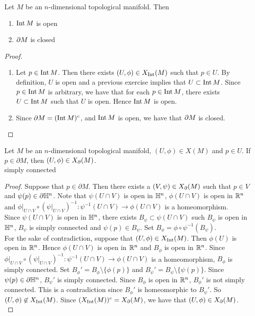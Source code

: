 \documentclass{book}
\begin{document}
	\begin{ex}
		Let $M$ be an $n$-dimensional topological manifold. Then 
		\begin{enumerate}
			\item $\operatorname{Int} M$ is open
			\item $\partial M$ is closed
		\end{enumerate}
	\end{ex}
	
	\begin{proof}\
		\begin{enumerate}
			\item Let $p \in \operatorname{Int} M$. Then there exists $(U, \phi) \in X_{\operatorname{Int}}(M)$ such that $p \in U$. By definition, $U$ is open and a previous exercise implies that $U \subset \operatorname{Int} M$. Since $p \in \operatorname{Int} M$ is arbitrary, we have that for each $p \in \operatorname{Int} M$, there exists $U \subset \operatorname{Int} M$ such that $U$ is open. Hence $\operatorname{Int} M$ is open. 
			\item Since $\partial M = (\operatorname{Int} M)^c$, and $\operatorname{Int} M$ is open, we have that $\partial M$ is closed.
		\end{enumerate}
	\end{proof}

	\begin{ex}
		Let $M$ be an $n$-dimensional topological manifold, $(U, \phi) \in X(M)$ and $p \in U$. If $p \in \partial M$, then $(U, \phi) \in X_{\partial}(M)$. \\
		\tbf{Hint:} simply connected
	\end{ex}

	\begin{proof}
		Suppose that $p \in \partial M$. Then there exists a $(V, \psi) \in X_{\partial}(M)$ such that $p \in V$ and $\psi(p) \in \partial \mathbb{H}^n$. Note that $\psi(U \cap V)$ is open in $\mathbb{H}^n$, $\phi(U \cap V)$ is open in $\mathbb{R}^n$ and $\phi|_{U \cap V} \circ (\psi|_{U \cap V})^{-1}: \psi^{-1}(U \cap V) \rightarrow \phi(U \cap V)$ is a homeomorphism. \\
		Since $\psi(U \cap V)$ is open in $\mathbb{H}^n$, there exists $B_{\psi} \subset \psi(U \cap V)$ such $B_{\psi}$ is open in $\mathbb{H}^n$, $B_{\psi}$ is simply connected and $\psi(p) \in B_{\psi}$. Set $B_{\phi} = \phi \circ \psi^{-1}(B_{\psi})$. \\
		For the sake of contradiction, suppose that $(U, \phi) \in X_{\operatorname{Int}}(M)$. Then $\phi(U)$ is open in $\mathbb{R}^n$. Hence $\phi(U \cap V)$ is open in $\mathbb{R}^n$ and $B_{\phi}$ is open in $\mathbb{R}^n$. Since $\phi|_{U \cap V} \circ (\psi|_{U \cap V})^{-1}: \psi^{-1}(U \cap V) \rightarrow \phi(U \cap V)$ is a homeomorphism, $B_{\phi}$ is simply connected. Set $B_{\phi}' = B_{\phi} \setminus \{\phi(p)\}$ and $B_{\psi}' = B_{\psi} \setminus \{\psi(p)\}$. Since $\psi(p) \in \partial \mathbb{H}^n$, $B_{\psi}'$ is simply connected. Since $B_{\phi}$ is open in $\mathbb{R}^n$, $B_{\phi}'$ is not simply connected. This is a contradiction since $B_{\phi}'$ is homeomorphic to $B_{\psi}'$. So $(U, \phi) \not \in X_{\operatorname{Int}}(M)$. Since $(X_{\operatorname{Int}}(M))^c = X_{\partial}(M)$, we have that $(U, \phi) \in X_{\partial}(M)$.\\
	\end{proof}
\end{document}
